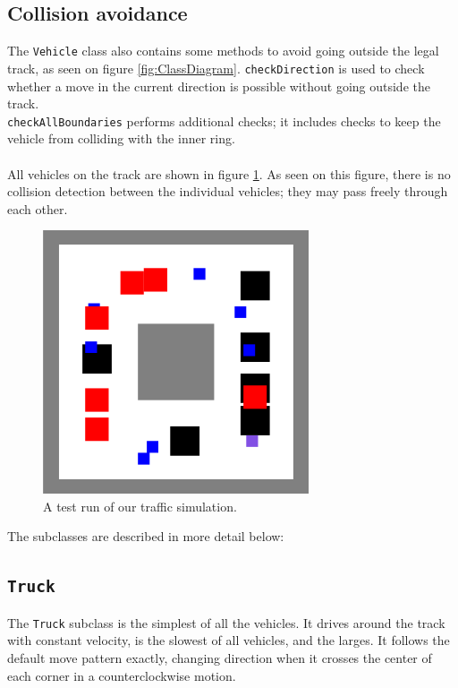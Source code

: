 \subsection{Collision avoidance}
The \texttt{Vehicle} class also contains some methods to avoid going outside the legal track, as seen on figure \ref{fig:ClassDiagram}. \texttt{checkDirection} is used to check whether a move in the current direction is possible without going outside the track. \\
\texttt{checkAllBoundaries} performs additional checks; it includes checks to keep the vehicle from colliding with the inner ring.\\
\\
All vehicles on the track are shown in figure \ref{fig:traffic1}. As seen on this figure, there is no collision detection between the individual vehicles; they may pass freely through each other. 

\begin{figure}[H]
    \centering
    \includegraphics[width=0.7\textwidth]{TrafficSimulation/fig/traffic3}
    \caption{A test run of our traffic simulation.}
    \label{fig:traffic1}
\end{figure}

The subclasses are described in more detail below:

\subsection{\texttt{Truck}}
The \texttt{Truck} subclass is the simplest of all the vehicles. It drives around the track with constant velocity, is the slowest of all vehicles, and the larges. It follows the default move pattern exactly, changing direction when it crosses the center of each corner in a counterclockwise motion.\\

